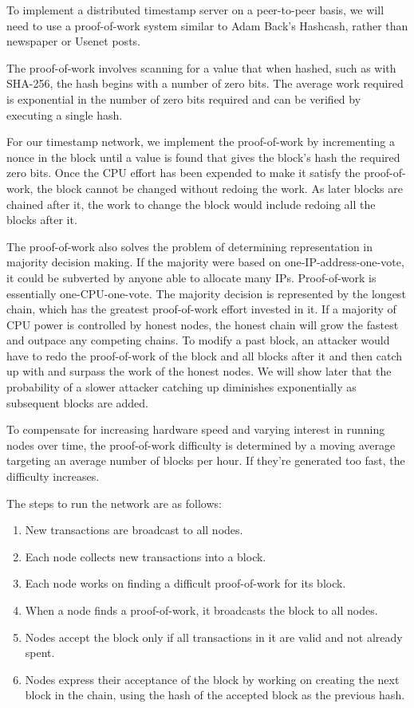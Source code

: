 \documentclass{article}
\begin{document}
To implement a distributed timestamp server on a peer-to-peer basis, we will need to use a proof-of-work system similar to Adam Back's Hashcash, rather than newspaper or Usenet posts.

The proof-of-work involves scanning for a value that when hashed, such as with SHA-256, the hash begins with a number of zero bits. The average work required is exponential in the number of zero bits required and can be verified by executing a single hash.

For our timestamp network, we implement the proof-of-work by incrementing a nonce in the block until a value is found that gives the block's hash the required zero bits. Once the CPU effort has been expended to make it satisfy the proof-of-work, the block cannot be changed without redoing the work. As later blocks are chained after it, the work to change the block would include redoing all the blocks after it.

The proof-of-work also solves the problem of determining representation in majority decision making. If the majority were based on one-IP-address-one-vote, it could be subverted by anyone able to allocate many IPs. Proof-of-work is essentially one-CPU-one-vote. The majority decision is represented by the longest chain, which has the greatest proof-of-work effort invested in it. If a majority of CPU power is controlled by honest nodes, the honest chain will grow the fastest and outpace any competing chains. To modify a past block, an attacker would have to redo the proof-of-work of the block and all blocks after it and then catch up with and surpass the work of the honest nodes. We will show later that the probability of a slower attacker catching up diminishes exponentially as subsequent blocks are added.

To compensate for increasing hardware speed and varying interest in running nodes over time, the proof-of-work difficulty is determined by a moving average targeting an average number of blocks per hour. If they're generated too fast, the difficulty increases.

The steps to run the network are as follows:

\begin{enumerate}
\item New transactions are broadcast to all nodes.
\item Each node collects new transactions into a block.
\item Each node works on finding a difficult proof-of-work for its block.
\item When a node finds a proof-of-work, it broadcasts the block to all nodes.
\item Nodes accept the block only if all transactions in it are valid and not already spent.
\item Nodes express their acceptance of the block by working on creating the next block in the chain, using the hash of the accepted block as the previous hash.
\end{enumerate}
\end{document}
